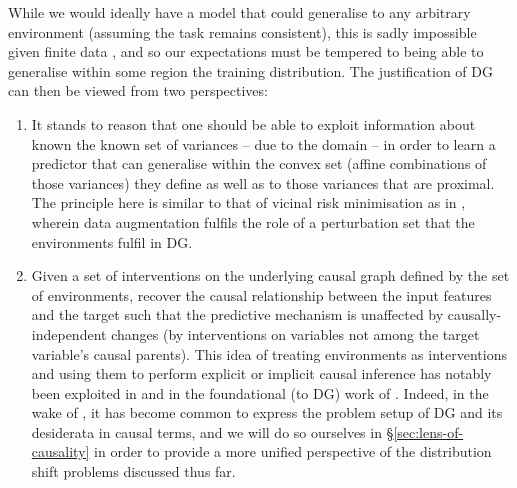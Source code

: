 %
While we would ideally have a model that could generalise to any arbitrary environment (assuming
the task remains consistent), this is sadly impossible given finite data
\citep{david2010impossibility}, and so our expectations must be tempered to being able to generalise
within some region the training distribution.
%
The justification of \ac{DG} can then be viewed from two perspectives:
\begin{enumerate}
        \item
        It stands to reason that one should be able to exploit information about known the known
        set of variances -- due to the domain -- in order to learn a predictor that can generalise
        within the convex set (affine combinations of those variances) they define as well as to
        those variances that are proximal.
        The principle here is similar to that of vicinal risk minimisation
        \citep{chapelle2000vicinal} as in \cite{zhang2017mixup}, wherein data augmentation fulfils
        the role of a perturbation set that the environments fulfil in \ac{DG}.
        \item
        Given a set of interventions on the underlying causal graph defined by the set of
        environments, recover the causal relationship between the input features and the target
        such that the predictive mechanism is unaffected by causally-independent changes (by
        interventions on variables not among the target variable's causal parents).
        This idea of treating environments as interventions and using them to perform explicit or
        implicit causal inference has notably been exploited in \cite{peters2016causal} and in the
        foundational (to \ac{DG}) work of \cite{arjovsky2019invariant}.
        Indeed, in the wake of \cite{arjovsky2019invariant}, it has become common \citep{
        gulrajani2020search, krueger2021out, mahajan2021domain, lin2022zin} to express the problem
        setup of \ac{DG} and its desiderata in causal terms, and we will do so ourselves in
        \S\ref{sec:lens-of-causality} in order to provide a more unified perspective of the
        distribution shift problems discussed thus far.
\end{enumerate}

